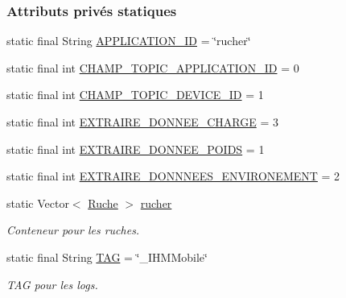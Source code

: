 \subsubsection*{Attributs privés statiques}
\begin{DoxyCompactItemize}
\item 
static final String \hyperlink{classcom_1_1example_1_1bee__honeyt_1_1_i_h_m_mobile_a92fe694fa515e68960a0add6212b2e86}{A\+P\+P\+L\+I\+C\+A\+T\+I\+O\+N\+\_\+\+ID} = \char`\"{}rucher\char`\"{}
\item 
static final int \hyperlink{classcom_1_1example_1_1bee__honeyt_1_1_i_h_m_mobile_aa49d99fb22c1f7d014bfb60d1d322fc6}{C\+H\+A\+M\+P\+\_\+\+T\+O\+P\+I\+C\+\_\+\+A\+P\+P\+L\+I\+C\+A\+T\+I\+O\+N\+\_\+\+ID} = 0
\item 
static final int \hyperlink{classcom_1_1example_1_1bee__honeyt_1_1_i_h_m_mobile_ac6703593d2a2d227d51c89b8185060fc}{C\+H\+A\+M\+P\+\_\+\+T\+O\+P\+I\+C\+\_\+\+D\+E\+V\+I\+C\+E\+\_\+\+ID} = 1
\item 
static final int \hyperlink{classcom_1_1example_1_1bee__honeyt_1_1_i_h_m_mobile_a5cc87519c4cba4d1f16dd98e300487a2}{E\+X\+T\+R\+A\+I\+R\+E\+\_\+\+D\+O\+N\+N\+E\+E\+\_\+\+C\+H\+A\+R\+GE} = 3
\item 
static final int \hyperlink{classcom_1_1example_1_1bee__honeyt_1_1_i_h_m_mobile_a2e9be0481d1498b9883b92bcb4d51619}{E\+X\+T\+R\+A\+I\+R\+E\+\_\+\+D\+O\+N\+N\+E\+E\+\_\+\+P\+O\+I\+DS} = 1
\item 
static final int \hyperlink{classcom_1_1example_1_1bee__honeyt_1_1_i_h_m_mobile_aea71e02f7d7a9a5767821ba3803bdd80}{E\+X\+T\+R\+A\+I\+R\+E\+\_\+\+D\+O\+N\+N\+N\+E\+E\+S\+\_\+\+E\+N\+V\+I\+R\+O\+N\+E\+M\+E\+NT} = 2
\item 
static Vector$<$ \hyperlink{classcom_1_1example_1_1bee__honeyt_1_1_ruche}{Ruche} $>$ \hyperlink{classcom_1_1example_1_1bee__honeyt_1_1_i_h_m_mobile_a80b422d45e9b5c91f7bcad1dca4ad292}{rucher}
\begin{DoxyCompactList}\small\item\em Conteneur pour les ruches. \end{DoxyCompactList}\item 
static final String \hyperlink{classcom_1_1example_1_1bee__honeyt_1_1_i_h_m_mobile_a366987bf9bb2ed1010b2f967d4efa263}{T\+AG} = \char`\"{}\+\_\+\+I\+H\+M\+Mobile\char`\"{}
\begin{DoxyCompactList}\small\item\em T\+AG pour les logs. \end{DoxyCompactList}\end{DoxyCompactItemize}


